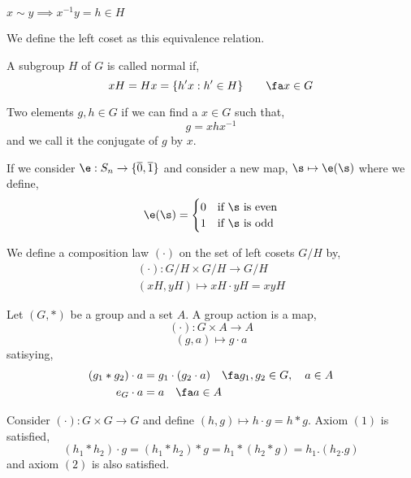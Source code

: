 \documentclass{article}
\begin{document}
\begin{ndefi}[Relation]
  $x \sim y \implies x^{-1}y = h\in H$
\end{ndefi}

\begin{ndefi}
  We define the left coset as this equivalence relation.
\end{ndefi}

\begin{ndefi}
  A subgroup $H$ of $G$ is called normal if,
  $$ xH = Hx = \{h'x : h' \in H\} \qquad \fa x \in G $$
\end{ndefi}

\begin{ndefi}[Conjugate]
  Two elements $g,h \in G$ if we can find a $x \in G$ such that,
  $$ g = x h x^{-1} $$
  and we call it the conjugate of $g$ by $x$.
\end{ndefi}

\begin{ndefi}[Signature]
  If we consider $\e : S_n \to \{\overline{0}, \overline{1}\}$ and consider a new map, $\s \mapsto \e(\s)$ where we define,
  $$ \e(\s) = \begin{cases}
    0 & \text{if $\s$ is even}\\
    1 & \text{if $\s$ is odd}
  \end{cases} $$
\end{ndefi}

\begin{ndefi}
  We define a composition law $(\cdot)$ on the set of left cosets $G/H$ by,
  \begin{align*}
    (\cdot) : G/H \times G/H \to G/H\\
    (xH, yH) \mapsto xH \cdot yH = xyH
  \end{align*}
\end{ndefi}

\begin{ndefi}
  Let $(G, *)$ be a group and a set $A$. A group action is a map,
  $$ (\cdot) : G \times A \to A $$
  $$ (g, a) \mapsto g \cdot a $$
  satisying,
  \begin{align}
    (g_1 * g_2) \cdot a &= g_1 \cdot (g_2 \cdot a) \quad \fa g_1, g_2 \in G, \quad a \in A\\
    e_G \cdot a &= a \quad \fa a\in A
  \end{align}
\end{ndefi}

\begin{ndefi}
  Consider $(\cdot) : G \times G \to G$ and define $(h, g) \mapsto h \cdot g = h * g$. Axiom $(1)$ is satisfied,
  $$ (h_1 * h_2) \cdot g = (h_1 * h_2) * g = h_1 * (h_2 * g) = h_1 . (h_2.g) $$
  and axiom $(2)$ is also satisfied.
\end{ndefi}
\end{document}
